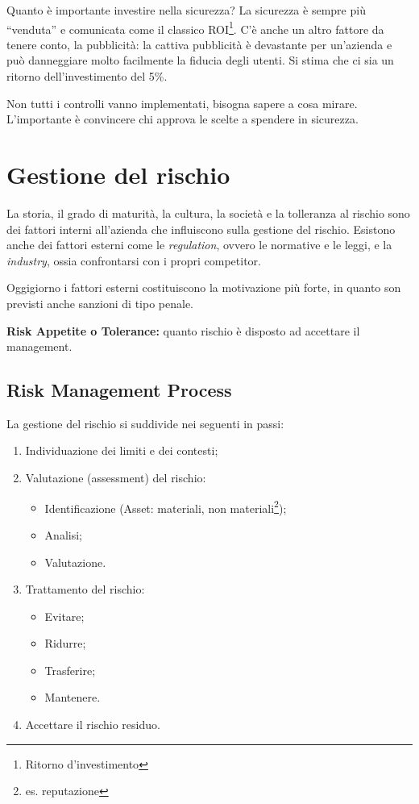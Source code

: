 \label{riskMng}

Quanto è importante investire nella sicurezza? La sicurezza è sempre più
``venduta'' e comunicata come il classico ROI\footnote{Ritorno d'investimento}.
C'è anche un altro fattore da tenere conto, la pubblicità: la cattiva
pubblicità è devastante per un'azienda e può danneggiare molto
facilmente la fiducia degli utenti. Si stima che ci sia un ritorno
dell'investimento del 5\%.

Non tutti i controlli vanno implementati, bisogna sapere a cosa mirare.
L'importante è convincere chi approva le scelte a spendere in sicurezza.



\chapter{Gestione del rischio}

La storia, il grado di maturità, la cultura, la società e la tolleranza
al rischio sono dei fattori interni all'azienda che influiscono sulla
gestione del rischio.
Esistono anche dei fattori esterni come le
\textit{regulation}, ovvero le normative e le leggi, e la
\textit{industry}, ossia confrontarsi con i propri competitor.

Oggigiorno i fattori esterni costituiscono la
motivazione più forte, in quanto son previsti anche sanzioni di tipo
penale.

\textbf{Risk Appetite o Tolerance:} quanto rischio è disposto ad accettare
il management.

\section{Risk Management Process}
La gestione del rischio si suddivide nei seguenti in passi:
\begin{enumerate}
\item Individuazione dei limiti e dei contesti;
\item Valutazione (assessment) del rischio:
\begin{itemize}
  \item Identificazione (Asset: materiali, non
  materiali\footnote{es. reputazione});
  \item Analisi;
  \item Valutazione.
\end{itemize}
\item Trattamento del rischio:
\begin{itemize}
  \item Evitare;
  \item Ridurre;
  \item Trasferire;
  \item Mantenere.
\end{itemize}
\item Accettare il rischio residuo.
\end{enumerate}

